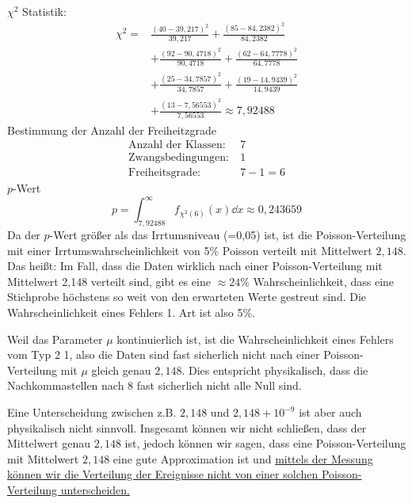 \documentclass[prb,12pt]{revtex4-2}
\theoremstyle{definition}
\theoremstyle{definition}
\begin{document}
$\chi^2$ Statistik:
\begin{align*}
	\chi^2 =& \frac{(40 - 39,217)^2}{39,217}+\frac{(85 - 84,2382)^2}{84,2382}\\
	&+\frac{(92 - 90,4718)^2}{90,4718}+\frac{(62 - 64,7778)^2}{64,7778}\\
	&+\frac{(25 - 34,7857)^2}{34,7857}+\frac{(19 - 14,9439)^2}{14,9439}\\
	&+\frac{(13 - 7,56553)^2}{7,56553}\approx 7,92488
\end{align*}
Bestimmung der Anzahl der Freiheitzgrade
\begin{align*}
\text{Anzahl der Klassen:}&~7\\
\text{Zwangsbedingungen:}&~1\\
\text{Freiheitsgrade:}&~7-1=6
\end{align*}
$p$-Wert
\[p=\int_{7,92488}^\infty f_{\chi^2(6)}(x) \dd{x}\approx 0,243659\]
Da der $p$-Wert größer als das Irrtumsniveau (=0,05) ist, ist die Poisson-Verteilung mit einer Irrtumswahrscheinlichkeit von 5\% Poisson verteilt mit Mittelwert $2,148$. Das heißt: Im Fall, dass die Daten wirklich nach einer Poisson-Verteilung mit Mittelwert 2,148 verteilt sind, gibt es eine $\approx 24\%$ Wahrscheinlichkeit, dass eine Stichprobe höchstens so weit von den erwarteten Werte gestreut sind. Die Wahrscheinlichkeit eines Fehlers 1. Art ist also 5\%. 

Weil das Parameter $\mu$ kontinuierlich ist, ist die Wahrscheinlichkeit eines Fehlers vom Typ 2 1, also die Daten sind fast sicherlich nicht nach einer Poisson-Verteilung mit $\mu$ gleich genau $2,148$. Dies entspricht physikalisch, dass die Nachkommastellen nach 8 fast sicherlich nicht alle Null sind. 

Eine Unterscheidung zwischen z.B. $2,148$ und $2,148+ 10^{-9}$ ist aber auch physikalisch nicht sinnvoll. Insgesamt können wir nicht schließen, dass der Mittelwert genau $2,148$ ist, jedoch können wir sagen, dass eine Poisson-Verteilung mit Mittelwert $2,148$ eine gute Approximation ist und \uline{mittels der Messung können wir die Verteilung der Ereignisse nicht von einer solchen Poisson-Verteilung unterscheiden.}
\end{document}
